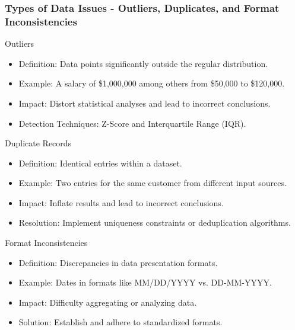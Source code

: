 \documentclass{beamer}
\begin{document}
\begin{frame}[fragile]
    \frametitle{Types of Data Issues - Outliers, Duplicates, and Format Inconsistencies}
    \begin{block}{Outliers}
        \begin{itemize}
            \item Definition: Data points significantly outside the regular distribution.
            \item Example: A salary of \$1,000,000 among others from \$50,000 to \$120,000.
            \item Impact: Distort statistical analyses and lead to incorrect conclusions.
            \item Detection Techniques: Z-Score and Interquartile Range (IQR).
        \end{itemize}
    \end{block}
    
    \begin{block}{Duplicate Records}
        \begin{itemize}
            \item Definition: Identical entries within a dataset.
            \item Example: Two entries for the same customer from different input sources.
            \item Impact: Inflate results and lead to incorrect conclusions.
            \item Resolution: Implement uniqueness constraints or deduplication algorithms.
        \end{itemize}
    \end{block}
    
    \begin{block}{Format Inconsistencies}
        \begin{itemize}
            \item Definition: Discrepancies in data presentation formats.
            \item Example: Dates in formats like MM/DD/YYYY vs. DD-MM-YYYY.
            \item Impact: Difficulty aggregating or analyzing data.
            \item Solution: Establish and adhere to standardized formats.
        \end{itemize}
    \end{block}
\end{frame}
\end{document}
